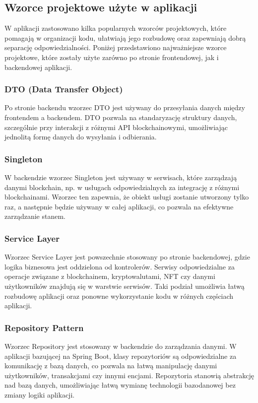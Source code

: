 \subsection{Wzorce projektowe użyte w aplikacji}

W aplikacji zastosowano kilka popularnych wzorców projektowych, które pomagają w organizacji kodu, ułatwiają jego rozbudowę oraz zapewniają dobrą separację odpowiedzialności. Poniżej przedstawiono najważniejsze wzorce projektowe, które zostały użyte zarówno po stronie frontendowej, jak i backendowej aplikacji.

\subsubsection{DTO (Data Transfer Object)}
Po stronie backendu wzorzec DTO jest używany do przesyłania danych między frontendem a backendem. DTO pozwala na standaryzację struktury danych, szczególnie przy interakcji z różnymi API blockchainowymi, umożliwiając jednolitą formę danych do wysyłania i odbierania.

\subsubsection{Singleton}
W backendzie wzorzec Singleton jest używany w serwisach, które zarządzają danymi blockchain, np. w usługach odpowiedzialnych za integrację z różnymi blockchainami. Wzorzec ten zapewnia, że obiekt usługi zostanie utworzony tylko raz, a następnie będzie używany w całej aplikacji, co pozwala na efektywne zarządzanie stanem.

\subsubsection{Service Layer}
Wzorzec Service Layer jest powszechnie stosowany po stronie backendowej, gdzie logika biznesowa jest oddzielona od kontrolerów. Serwisy odpowiedzialne za operacje związane z blockchainem, kryptowalutami, NFT czy danymi użytkowników znajdują się w warstwie serwisów. Taki podział umożliwia łatwą rozbudowę aplikacji oraz ponowne wykorzystanie kodu w różnych częściach aplikacji.

\subsubsection{Repository Pattern}
Wzorzec Repository jest stosowany w backendzie do zarządzania danymi. W aplikacji bazującej na Spring Boot, klasy repozytoriów są odpowiedzialne za komunikację z bazą danych, co pozwala na łatwą manipulację danymi użytkowników, transakcjami czy innymi encjami. Repozytoria stanowią abstrakcję nad bazą danych, umożliwiając łatwą wymianę technologii bazodanowej bez zmiany logiki aplikacji.

